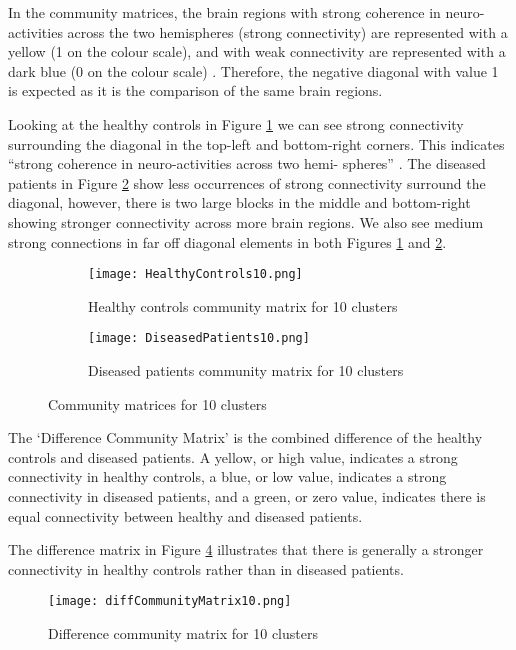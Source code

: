 In the community matrices, the brain regions with strong coherence in neuro-activities across the two hemispheres (strong connectivity) are represented with a yellow (1 on the colour scale), and with weak connectivity are represented with a dark blue (0 on the colour scale) . Therefore, the negative diagonal with value 1 is expected as it is the comparison of the same brain regions.

Looking at the healthy controls in Figure \ref{fig:CM10healthy} we can see strong connectivity surrounding the diagonal in the top-left and bottom-right corners. This indicates ``strong coherence in neuro-activities across two hemi- spheres'' \cite{BrainRegion}. The diseased patients in Figure \ref{fig:CM10diseased} show less occurrences of strong connectivity surround the diagonal, however, there is two large blocks in the middle and bottom-right showing stronger connectivity across more brain regions. We also see medium strong connections in far off diagonal elements in both Figures \ref{fig:CM10healthy} and \ref{fig:CM10diseased}.

\begin{figure}[h!] 
	\centering
	\begin{subfigure}[b]{.49\textwidth}
		\texttt{[image: HealthyControls10.png]}
		\caption{Healthy controls community matrix for 10 clusters}
		\label{fig:CM10healthy}
	\end{subfigure}
	\begin{subfigure}[b]{.49\textwidth}
		\texttt{[image: DiseasedPatients10.png]}
		\caption{Diseased patients community matrix for 10 clusters}
		\label{fig:CM10diseased}
	\end{subfigure}
	\caption{Community matrices for 10 clusters}
	\label{fig:CM10}
\end{figure}

The `Difference Community Matrix' is the combined difference of the healthy controls and diseased patients. A yellow, or high value, indicates a strong connectivity in healthy controls, a blue, or low value, indicates a strong connectivity in diseased patients, and a green, or zero value, indicates there is equal connectivity between healthy and diseased patients. 

The difference matrix in Figure \ref{fig:CM10diff} illustrates that there is generally a stronger connectivity in healthy controls rather than in diseased patients.

\begin{figure}[h!] 
	\centering
	\texttt{[image: diffCommunityMatrix10.png]}
	\caption{Difference community matrix for 10 clusters}
	\label{fig:CM10diff}
\end{figure}

